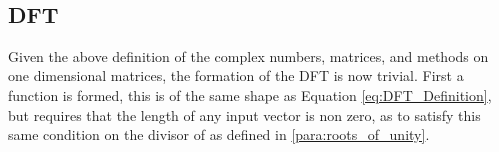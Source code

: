 \begin{code}%
%
\>[2]\AgdaSpace{}%
\AgdaSymbol{:}\AgdaSpace{}%
\AgdaSpace{}%
\AgdaSymbol{(}\AgdaSpace{}%
\AgdaSymbol{)}\AgdaSpace{}%
\<%
\\
%
\>[2]\AgdaSpace{}%
\AgdaSymbol{(}\AgdaSpace{}%
\AgdaSymbol{)}\AgdaSpace{}%
\AgdaSymbol{=}\AgdaSpace{}%
\AgdaSpace{}%
\<%
\end{code}

\subsection{DFT}
Given the above definition of the complex numbers, matrices, and methods on one 
dimensional matrices, the formation of the DFT is now trivial.
First a function  is formed, this is of the same shape as Equation 
\ref{eq:DFT_Definition}, but requires that the length of any input vector is 
non zero, as to satisfy this same condition on the divisor of  as defined 
in \ref{para:roots_of_unity}.

\begin{code}%
%
\>[2]\AgdaSpace{}%
\AgdaSymbol{:}\AgdaSpace{}%
\AgdaSpace{}%
\AgdaSpace{}%
\AgdaSymbol{:}\AgdaSpace{}%
\AgdaSpace{}%
\AgdaSpace{}%
\AgdaSpace{}%
\AgdaSpace{}%
\AgdaSpace{}%
\AgdaSymbol{(}\AgdaSpace{}%
\AgdaSymbol{)}\AgdaSpace{}%
\AgdaSpace{}%
\AgdaSpace{}%
\AgdaSpace{}%
\AgdaSymbol{(}\AgdaSpace{}%
\AgdaSymbol{)}\AgdaSpace{}%
\<%
\\
%
\>[2]\AgdaSpace{}%
\AgdaSymbol{\{}\AgdaSymbol{\}}\AgdaSpace{}%
\AgdaSpace{}%
\AgdaSpace{}%
\AgdaSymbol{=}\AgdaSpace{}%
\AgdaSpace{}%
\AgdaSpace{}%
\AgdaSpace{}%
\AgdaSpace{}%
\AgdaSpace{}%
\AgdaSpace{}%
\AgdaOperator{\AgdaField{*}}\AgdaSpace{}%
\AgdaSpace{}%
\AgdaSpace{}%
\AgdaSymbol{(}\AgdaSpace{}%
\AgdaSpace{}%
\AgdaSpace{}%
\AgdaSpace{}%
\AgdaSymbol{)}\<%
\end{code}

